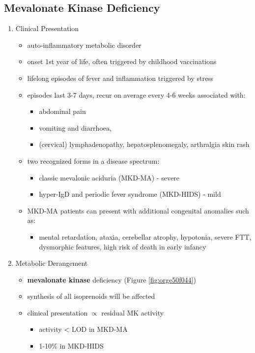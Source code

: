 \documentclass[12pt]{scrartcl}
\begin{document}
\subsection{Mevalonate Kinase Deficiency}
\label{sec:org13b7106}
\begin{enumerate}
\item Clinical Presentation
\label{sec:org3fa3b06}
\begin{itemize}
\item auto-inflammatory metabolic disorder
\item onset 1st year of life, often triggered by childhood vaccinations
\item lifelong episodes of fever and inflammation triggered by stress
\item episodes last 3-7 days, recur on average every 4-6 weeks associated with:
\begin{itemize}
\item abdominal pain
\item vomiting and diarrhoea,
\item (cervical) lymphadenopathy, hepatosplenomegaly, arthralgia skin rash
\end{itemize}
\item two recognized forms in a disease spectrum:
\begin{itemize}
\item classic mevalonic aciduria (MKD-MA) - severe
\item hyper-IgD and periodic fever syndrome (MKD-HIDS) - mild
\end{itemize}

\item MKD-MA patients can present with additional congenital anomalies
such as:
\begin{itemize}
\item mental retardation, ataxia, cerebellar atrophy, hypotonia, severe
FTT, dysmorphic features, high risk of death in early infancy
\end{itemize}
\end{itemize}

\item Metabolic Derangement
\label{sec:orgab60a6c}
\begin{itemize}
\item \textbf{mevalonate kinase} deficiency (Figure \ref{fig:orge50f044})
\end{itemize}
\begin{itemize}
\item synthesis of all isoprenoids will be affected
\item clinical presentation \(\propto\) residual MK activity
\begin{itemize}
\item activity < LOD in MKD-MA
\item 1-10\% in MKD-HIDS
\end{itemize}
\end{itemize}


\end{enumerate}
\end{document}
